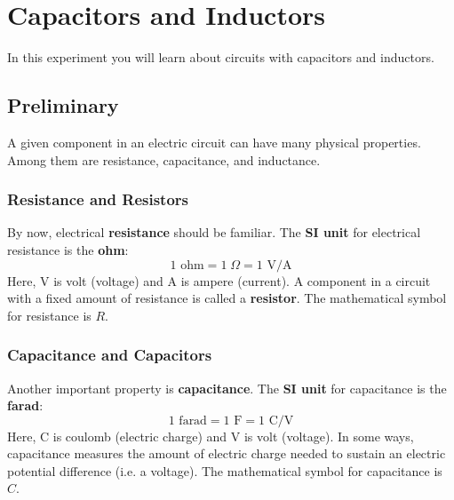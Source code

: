\setcounter{chapter}{4}
\chapter{Capacitors and Inductors}
In this experiment you will learn about circuits with capacitors and inductors.
\section{Preliminary}
A given component in an electric circuit can have many physical properties. Among them are resistance, capacitance, and inductance.
\subsection{Resistance and Resistors}
By now, electrical \textbf{resistance} should be familiar. The \textbf{SI unit} for electrical resistance is the \textbf{ohm}:
\begin{equation}
	1 \text{ ohm} = 1\;\Omega = 1 \text{ V/A}
\end{equation}
Here, V is volt (voltage) and A is ampere (current). A component in a circuit with a fixed amount of resistance is called a \textbf{resistor}. The mathematical symbol for resistance is $R$.
\subsection{Capacitance and Capacitors}
Another important property is \textbf{capacitance}. The \textbf{SI unit} for capacitance is the \textbf{farad}:
\begin{equation}
	1 \text{ farad} = 1 \text{ F} = 1 \text{ C/V}
\end{equation}
Here, C is coulomb (electric charge) and V is volt (voltage). In some ways, capacitance measures the amount of electric charge needed to sustain an electric potential difference (i.e. a voltage). The mathematical symbol for capacitance is $C$.

